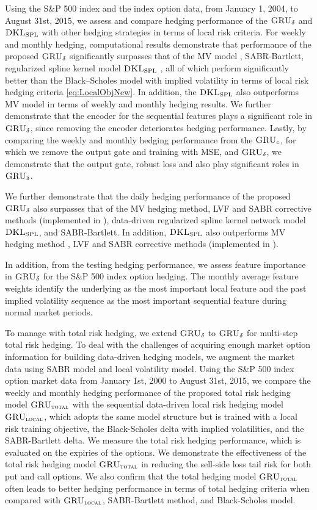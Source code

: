 \documentclass[letterpaper,12pt,titlepage,oneside,final]{book}
\numberwithin{equation}{section}
\theoremstyle{definition}
\newcommand{\model}{\textsc{GRU}_\delta}
\newcommand{\modelT}{\textsc{GRU}_{\textsc{total}}}
\newcommand{\modelL}{\textsc{GRU}_{\textsc{local}}}
\newcommand{\DKLs}{\bf\textsc{DKL}_{\text{SPL}}}
\begin{document}
Using the S\&P 500 index and the index option data,  from January 1, 2004, to  August 31st, 2015, we assess and compare hedging performance of the  $\model$ and $\DKLs$ with other hedging strategies in terms of local risk criteria.
For weekly and monthly hedging, computational results demonstrate that performance of the proposed $\model$  significantly surpasses that of the MV model , SABR-Bartlett, regularized spline kernel model $\DKLs$ , all of which perform significantly better than the Black–Scholes model with implied volatility in terms of local risk hedging criteria \eqref{eq:LocalObjNew}.
In addition, the $\DKLs$ also outperforms MV model in terms of weekly and monthly hedging results.
We further demonstrate that the encoder for the sequential features plays a significant role in $\model$, since removing the encoder deteriorates hedging performance.
Lastly, by comparing the weekly and monthly hedging performance from the  $\textsc{GRU}_{c}$, for which we remove the output gate and training with MSE, and $\model$, we demonstrate that the output gate,  robust loss and  also play  significant roles in $\model$.

We further demonstrate that the daily hedging performance of the proposed $\model$  also surpasses that of the MV hedging method, LVF and SABR corrective methods  (implemented in \cite{hulloptimal}), data-driven regularized spline kernel network model $\DKLs$, and SABR-Bartlett. In addition, $\DKLs$ also outperforms MV hedging method , LVF and SABR corrective methods  (implemented in \cite{hulloptimal}).

In addition, from the testing hedging performance, we assess feature importance in  $\model$  for the S\&P 500 index  option hedging. The monthly average feature weights identify the underlying as the most important local feature and the past implied volatility sequence as the most important sequential feature during normal market periods.

To manage with total risk hedging, we extend  $\model$ to $\model$ for multi-step total risk hedging.  To deal with the challenges of acquiring enough market option information for building data-driven hedging models,  we augment the market data using SABR model and local volatility model. Using the S\&P 500 index  option market data from January 1st, 2000 to  August 31st, 2015, we compare  the weekly and monthly hedging performance of the proposed total risk hedging model $\modelT$  with the sequential data-driven local risk hedging model $\modelL$, which adopts the same model structure but is trained with a local risk training objective, the Black-Scholes delta with implied volatilities, and the SABR-Bartlett delta. We measure the total risk hedging performance, which is evaluated on the expiries of the options. We demonstrate the effectiveness of the total risk hedging model $\modelT$ in reducing the sell-side loss tail risk for both put and call options. We also confirm that the  total hedging model $\modelT$ often leads to better hedging performance in terms of total hedging criteria when compared with $\modelL$,  SABR-Bartlett method, and Black-Scholes model. 
\end{document}
